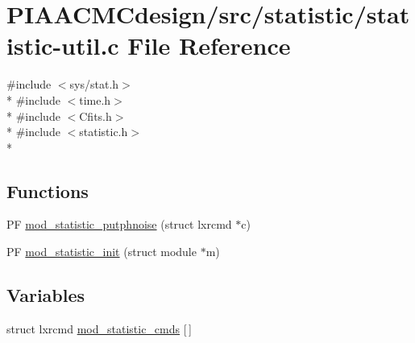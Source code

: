 \hypertarget{PIAACMCdesign_2src_2statistic_2statistic-util_8c}{\section{P\+I\+A\+A\+C\+M\+Cdesign/src/statistic/statistic-\/util.c File Reference}
\label{PIAACMCdesign_2src_2statistic_2statistic-util_8c}
}
{\ttfamily \#include $<$sys/stat.\+h$>$}\\*
{\ttfamily \#include $<$time.\+h$>$}\\*
{\ttfamily \#include $<$Cfits.\+h$>$}\\*
{\ttfamily \#include $<$statistic.\+h$>$}\\*
\subsection*{Functions}
\begin{DoxyCompactItemize}
\item 
P\+F \hyperlink{PIAACMCdesign_2src_2statistic_2statistic-util_8c_adf68f86d319ba00ac620d3468420f5d4}{mod\+\_\+statistic\+\_\+putphnoise} (struct lxrcmd $\ast$c)
\item 
P\+F \hyperlink{PIAACMCdesign_2src_2statistic_2statistic-util_8c_aedea1c5063287d3e0ce501bf630a3b05}{mod\+\_\+statistic\+\_\+init} (struct module $\ast$m)
\end{DoxyCompactItemize}
\subsection*{Variables}
\begin{DoxyCompactItemize}
\item 
struct lxrcmd \hyperlink{PIAACMCdesign_2src_2statistic_2statistic-util_8c_a0adc435a6dca61c948182a0d8d2c9dc4}{mod\+\_\+statistic\+\_\+cmds} \mbox{[}$\,$\mbox{]}
\end{DoxyCompactItemize}


